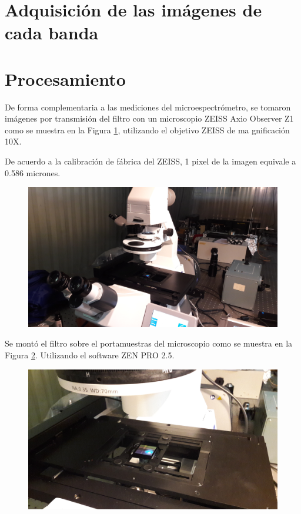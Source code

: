 \documentclass{ctuthesis}
\begin{document}
\singlespacing
\section*{Adquisición de las imágenes de cada banda}
\singlespacing
\section*{Procesamiento }
\singlespacing


De forma complementaria a las mediciones del microespectrómetro, se tomaron imágenes por transmisión del filtro con un microscopio ZEISS Axio Observer Z1 como se muestra en la Figura \ref{fig:ZEISSdellabo}, utilizando el objetivo ZEISS de ma	gnificación 10X. 

De acuerdo a la calibración de fábrica del ZEISS, 1 pixel de la imagen equivale a 0.586 micrones. 
\vspace{1cm}
\vspace{1cm}
\begin{figure}[H]
	\centering
	\includegraphics[scale=0.1]{Figs/defectosZEISS/b.jpg}
	\caption{ }
	\label{fig:ZEISSdellabo}
\end{figure}

Se montó el filtro sobre el portamuestras del microscopio como se muestra en la Figura \ref{fig:filtroenZEISS}.
Utilizando el software ZEN PRO 2.5.

\begin{figure}[H]
	\centering
	\includegraphics[scale=0.1]{Figs/defectosZEISS/a.jpg}
	\caption{ }
	\label{fig:filtroenZEISS}
\end{figure}
\end{document}
